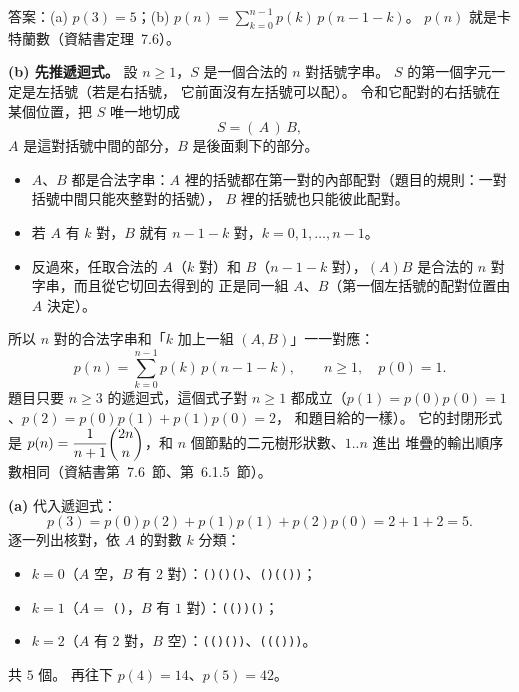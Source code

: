 \begin{pastsoln}
答案：(a) $p(3) = 5$；(b) $p(n) = \sum_{k=0}^{n-1} p(k)\,p(n-1-k)$。 $p(n)$ 就是卡特蘭數（資結書定理~7.6）。

\textbf{(b) 先推遞迴式。} 設 $n \ge 1$，$S$ 是一個合法的 $n$ 對括號字串。 $S$ 的第一個字元一定是左括號（若是右括號，
它前面沒有左括號可以配）。 令和它配對的右括號在某個位置，把 $S$ 唯一地切成
\[
S = (\,A\,)\,B,
\]
$A$ 是這對括號中間的部分，$B$ 是後面剩下的部分。
\begin{itemize}
\item $A$、$B$ 都是合法字串：$A$ 裡的括號都在第一對的內部配對（題目的規則：一對括號中間只能夾整對的括號），
$B$ 裡的括號也只能彼此配對。
\item 若 $A$ 有 $k$ 對，$B$ 就有 $n - 1 - k$ 對，$k = 0, 1, \ldots, n - 1$。
\item 反過來，任取合法的 $A$（$k$ 對）和 $B$（$n - 1 - k$ 對），$(A)B$ 是合法的 $n$ 對字串，而且從它切回去得到的
正是同一組 $A$、$B$（第一個左括號的配對位置由 $A$ 決定）。
\end{itemize}
所以 $n$ 對的合法字串和「$k$ 加上一組 $(A, B)$」一一對應：
\[
p(n) = \sum_{k=0}^{n-1} p(k)\, p(n-1-k),\qquad n \ge 1,\quad p(0) = 1.
\]
題目只要 $n \ge 3$ 的遞迴式，這個式子對 $n \ge 1$ 都成立（$p(1) = p(0)p(0) = 1$、$p(2) = p(0)p(1) + p(1)p(0) = 2$，
和題目給的一樣）。 它的封閉形式是 $p(n) = \dfrac{1}{n+1}\dbinom{2n}{n}$，和 $n$ 個節點的二元樹形狀數、$1..n$ 進出
堆疊的輸出順序數相同（資結書第~7.6~節、第~6.1.5~節）。

\textbf{(a)} 代入遞迴式：
\[
p(3) = p(0)p(2) + p(1)p(1) + p(2)p(0) = 2 + 1 + 2 = 5.
\]
逐一列出核對，依 $A$ 的對數 $k$ 分類：
\begin{itemize}
\item $k = 0$（$A$ 空，$B$ 有 $2$ 對）：\texttt{()()()}、\texttt{()(())}；
\item $k = 1$（$A = $ \texttt{()}，$B$ 有 $1$ 對）：\texttt{(())()}；
\item $k = 2$（$A$ 有 $2$ 對，$B$ 空）：\texttt{(()())}、\texttt{((()))}。
\end{itemize}
共 $5$ 個。 再往下 $p(4) = 14$、$p(5) = 42$。
\end{pastsoln}

